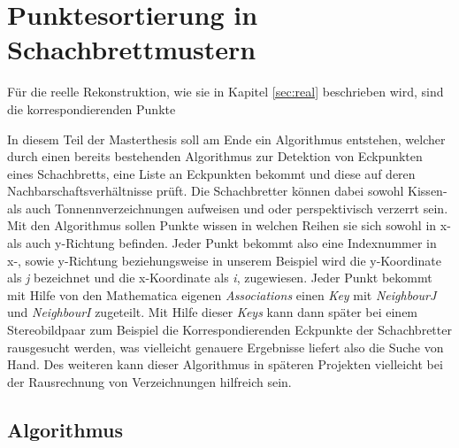 \chapter{Punktesortierung in Schachbrettmustern}
\label{sec:schachbrettAlg} 


Für die reelle Rekonstruktion, wie sie in Kapitel \ref{sec:real} beschrieben wird, sind die korrespondierenden Punkte


In diesem Teil der Masterthesis soll am Ende ein Algorithmus entstehen, welcher durch einen bereits bestehenden Algorithmus zur Detektion von Eckpunkten eines Schachbretts, eine Liste an Eckpunkten bekommt und diese auf deren Nachbarschaftsverhältnisse prüft. Die Schachbretter können dabei sowohl Kissen- als auch Tonnennverzeichnungen aufweisen und oder perspektivisch verzerrt sein. Mit den Algorithmus sollen Punkte wissen in welchen Reihen sie sich sowohl in x- als auch y-Richtung befinden. Jeder Punkt bekommt also eine Indexnummer in x-, sowie y-Richtung beziehungsweise in unserem Beispiel wird die y-Koordinate als \textit{j} bezeichnet und die x-Koordinate als \textit{i}, zugewiesen. Jeder Punkt bekommt mit Hilfe von den Mathematica eigenen \textit{Associations} einen \textit{Key} mit \textit{NeighbourJ} und \textit{NeighbourI} zugeteilt. Mit Hilfe dieser \textit{Keys} kann dann später bei einem Stereobildpaar zum Beispiel die Korrespondierenden Eckpunkte der Schachbretter rausgesucht werden, was vielleicht genauere Ergebnisse liefert also die Suche von Hand. Des weiteren kann dieser Algorithmus in späteren Projekten vielleicht bei der Rausrechnung von Verzeichnungen hilfreich sein.\\



\section{Algorithmus}
%
%
%

